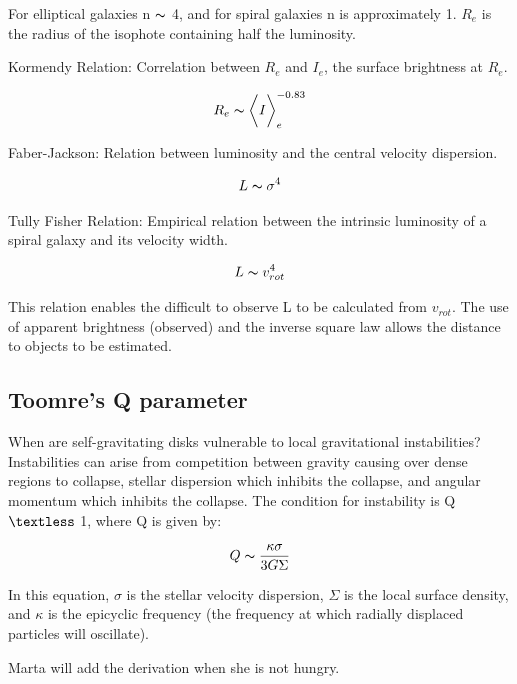 For elliptical galaxies n $\thicksim$ 4, and for spiral galaxies n is approximately 1.  $R_e$ is the radius of the isophote containing half the luminosity.  

Kormendy Relation:  Correlation between $R_e$ and $I_e$, the surface brightness at $R_e$.  

\begin{equation}
R_e \thicksim \bigg<I\bigg>_e^{-0.83}
\end{equation}

Faber-Jackson:  Relation between luminosity and the central velocity dispersion.

\begin{equation}
L \thicksim \sigma^4
\end{equation}

Tully Fisher Relation:  Empirical relation between the intrinsic luminosity of a spiral galaxy and its velocity width.

\begin{equation}
L \thicksim v_{rot}^4
\end{equation}

This relation enables the difficult to observe L to be calculated from $v_{rot}$.  The use of apparent brightness (observed) and the inverse square law allows the distance to objects to be estimated.  

\subsection{Toomre's Q parameter}

When are self-gravitating disks vulnerable to local gravitational instabilities?  Instabilities can arise from competition between gravity causing over dense regions to collapse, stellar dispersion which inhibits the collapse, and angular momentum which inhibits the collapse.  The condition for instability is Q $\textless$ 1, where Q is given by:

\begin{equation}
Q \thicksim \frac{\kappa \sigma}{3G\Sigma}
\end{equation}

In this equation, $\sigma$ is the stellar velocity dispersion, $\Sigma$ is the local surface density, and $\kappa$ is the epicyclic frequency (the frequency at which radially displaced particles will oscillate).

Marta will add the derivation when she is not hungry.





